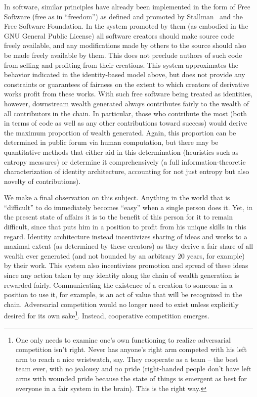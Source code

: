 \documentclass[pra,twocolumn,groupedaddress,10pt]{revtex4}
\theoremstyle{definition}
\begin{document}
In software, similar principles have already been implemented in the form of Free Software (free as in ``freedom'') as defined and promoted by Stallman~\cite{fsf} and the Free Software Foundation. In the system promoted by them (as embodied in the GNU General Public License) all software creators should make source code freely available, and any modifications made by others to the source should also be made freely available by them. This does not preclude authors of such code from selling and profiting from their creations. This system approximates the behavior indicated in the identity-based model above, but does not provide any constraints or guarantees of fairness on the extent to which creators of derivative works profit from these works. With such free software being treated as identities, however, downstream wealth generated always contributes fairly to the wealth of all contributors in the chain. In particular, those who contribute the most (both in terms of code as well as any other contributions toward success) would derive the maximum proportion of wealth generated. Again, this proportion can be determined in public forum via human computation, but there may be quantitative methods that either aid in this determination (heuristics such as entropy measures) or determine it comprehensively (a full information-theoretic characterization of identity architecture, accounting for not just entropy but also novelty of contributions).

We make a final observation on this subject. Anything in the world that is ``difficult'' to do immediately becomes ``easy'' when a single person does it. Yet, in the present state of affairs it is to the benefit of this person for it to remain difficult, since that puts him in a position to profit from his unique skills in this regard. Identity architecture instead incentivizes sharing of ideas and works to a maximal extent (as determined by these creators) as they derive a fair share of all wealth ever generated (and not bounded by an arbitrary $20$ years, for example) by their work. This system also incentivizes promotion and spread of these ideas since any action taken by any identity along the chain of wealth generation is rewarded fairly. Communicating the existence of a creation to someone in a position to use it, for example, is an act of value that will be recognized in the chain. Adversarial competition would no longer need to exist unless explicitly desired for its own sake\footnote{One only needs to examine one's own functioning to realize adversarial competition isn't right. Never has anyone's right arm competed with his left arm to reach a nice wristwatch, say. They cooperate as a team -- the best team ever, with no jealousy and no pride (right-handed people don't have left arms with wounded pride because the state of things is emergent as best for everyone in a fair system in the brain). This is the right way.}. Instead, cooperative competition emerges.
\end{document}

